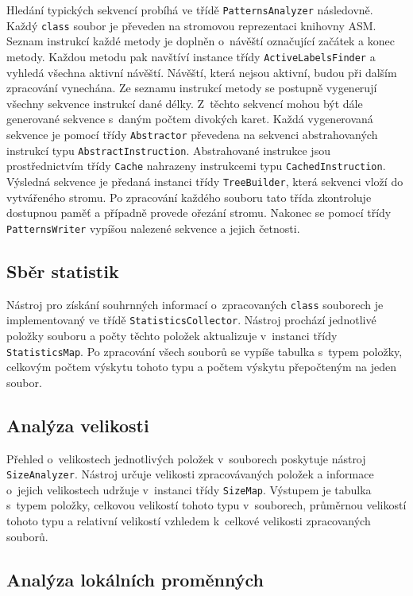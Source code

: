 Hledání typických sekvencí probíhá ve třídě \texttt{PatternsAnalyzer} následovně. Každý \texttt{class} soubor je převeden na stromovou reprezentaci knihovny ASM. Seznam instrukcí každé metody je doplněn o~návěští označující začátek a konec metody. Každou metodu pak navštíví instance třídy \texttt{ActiveLabelsFinder} a vyhledá všechna aktivní návěští. Návěští, která nejsou aktivní, budou při dalším zpracování vynechána. Ze seznamu instrukcí metody se postupně vygenerují všechny sekvence instrukcí dané délky. Z~těchto sekvencí mohou být dále generované sekvence s~daným počtem divokých karet. Každá vygenerovaná sekvence je pomocí třídy \texttt{Abstractor} převedena na sekvenci abstrahovaných instrukcí typu \texttt{AbstractInstruction}. Abstrahované instrukce jsou prostřednictvím třídy \texttt{Cache} nahrazeny instrukcemi typu \texttt{CachedInstruction}. Výsledná sekvence je předaná instanci třídy \texttt{TreeBuilder}, která sekvenci vloží do vytvářeného stromu. Po zpracování každého souboru tato třída zkontroluje dostupnou paměť a případně provede ořezání stromu. Nakonec se pomocí třídy \texttt{PatternsWriter} vypíšou nalezené sekvence a jejich četnosti.

\subsection{Sběr statistik}

Nástroj pro získání souhrnných informací o~zpracovaných \texttt{class} souborech je implementovaný ve třídě \texttt{StatisticsCollector}. Nástroj prochází jednotlivé položky souboru a  počty těchto položek aktualizuje v~instanci třídy \texttt{StatisticsMap}. Po zpracování všech souborů se vypíše tabulka s~typem položky, celkovým počtem výskytu tohoto typu a počtem výskytu přepočteným na jeden soubor. 

\subsection{Analýza velikosti}

Přehled o~velikostech jednotlivých položek v~souborech poskytuje nástroj \texttt{SizeAnalyzer}. Nástroj určuje velikosti zpracovávaných položek a informace o~jejich velikostech udržuje v~instanci třídy \texttt{SizeMap}. Výstupem je tabulka s~typem položky, celkovou velikostí tohoto typu v~souborech, průměrnou velikostí tohoto typu a relativní velikostí vzhledem k~celkové velikosti zpracovaných souborů. 

\subsection{Analýza lokálních proměnných}

